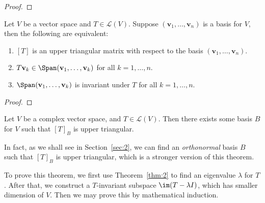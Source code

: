 \documentclass[thmcnt=section, color=blue, 12pt]{my-elegantbook}
\begin{document}
\begin{proof}
\end{proof}


\begin{proposition} \label{pro:2}
    Let $V$ be a vector space and $T \in \mathcal{L}(V)$. Suppose $(\mathbf{v}_1, \ldots, \mathbf{v}_n)$ is a basis for $V$, then the following are equivalent:
    \begin{enumerate}
        \item $[T]$ is an upper triangular matrix with respect to the basis $(\mathbf{v}_1, \ldots, \mathbf{v}_n)$.
        \item $T \mathbf{v}_k \in \Span(\mathbf{v}_1, \ldots, \mathbf{v}_k)$ for all $k = 1, \ldots, n$.
        \item $\Span(\mathbf{v}_1, \ldots, \mathbf{v}_k)$ is invariant under $T$ for all $k = 1, \ldots, n$.
    \end{enumerate}
\end{proposition}

\begin{proof}
\end{proof}


\begin{theorem}\label{thm:3}
    Let $V$ be a complex vector space, and $T \in \mathcal{L}(V)$. Then there exists some basis $B$ for $V$ such that $[T]_B$ is upper triangular.
\end{theorem}

\begin{remark}
    In fact, as we shall see in Section~\ref{sec:2}, we can find an \textit{orthonormal} basis $B$ such that $[T]_B$ is upper triangular, which is a stronger version of this theorem.
\end{remark}

\par To prove this theorem, we first use Theorem~\ref{thm:2} to find an eigenvalue $\lambda$ for $T$. After that, we construct a $T$-invariant subspace $\im(T - \lambda I)$, which has smaller dimension of $V$. Then we may prove this by mathematical induction. 
\end{document}
